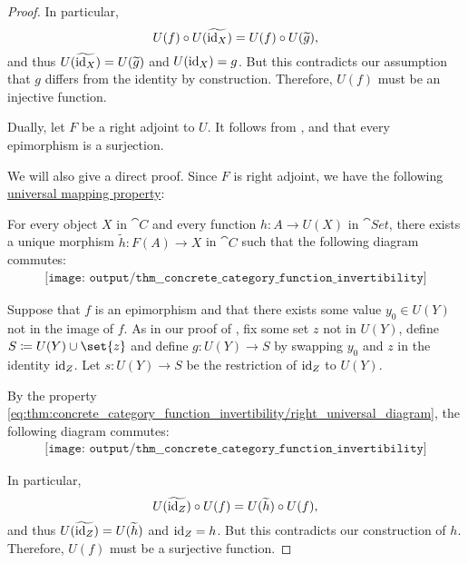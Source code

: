 \begin{proof}
  In particular,
  \begin{equation*}
    U(f) \bincirc U(\widetilde{\id_X}) = U(f) \bincirc U(\widetilde{g}),
  \end{equation*}
  and thus \( U(\widetilde{\operatorname{id}_X}) = U(\widetilde{g}) \) and \( U(\operatorname{id}_X) = g \). But this contradicts our assumption that \( g \) differs from the identity by construction. Therefore, \( U(f) \) must be an injective function.

   Dually, let \( F \) be a right adjoint to \( U \). It follows from ,  and  that every epimorphism is a surjection.

  We will also give a direct proof. Since \( F \) is right adjoint, we have the following \hyperref[rem:universal_mapping_property]{universal mapping property}:
  \begin{displayquote}
    For every object \( X \) in \( \cat{C} \) and every function \( h: A \to U(X) \) in \( \cat{Set} \), there exists a unique morphism \( \widetilde{h}: F(A) \to X \) in \( \cat{C} \) such that the following diagram commutes:
    \begin{equation}\label{eq:thm:concrete_category_function_invertibility/right_universal_diagram}
      \begin{aligned}
        \texttt{[image: output/thm\_\_concrete\_category\_function\_invertibility]}
      \end{aligned}
    \end{equation}
  \end{displayquote}

  Suppose that \( f \) is an epimorphism and that there exists some value \( y_0 \in U(Y) \) not in the image of \( f \). As in our proof of , fix some set \( z \) not in \( U(Y) \), define \( S \coloneqq U(Y) \cup \set{ z } \) and define \( g: U(Y) \to S \) by swapping \( y_0 \) and \( z \) in the identity \( \operatorname{id}_Z \). Let \( s: U(Y) \to S \) be the restriction of \( \operatorname{id}_Z \) to \( U(Y) \).

  By the property \eqref{eq:thm:concrete_category_function_invertibility/right_universal_diagram}, the following diagram commutes:
  \begin{equation}\label{eq:thm:concrete_category_function_invertibility/right_diagram}
    \begin{aligned}
      \texttt{[image: output/thm\_\_concrete\_category\_function\_invertibility]}
    \end{aligned}
  \end{equation}

  In particular,
  \begin{equation*}
  U(\widetilde{\id_Z}) \bincirc U(f) = U(\widetilde{h}) \bincirc U(f),
  \end{equation*}
  and thus \( U(\widetilde{\operatorname{id}_Z}) = U(\widetilde{h}) \) and \( \operatorname{id}_Z = h \). But this contradicts our construction of \( h \). Therefore, \( U(f) \) must be a surjective function.
\end{proof}

